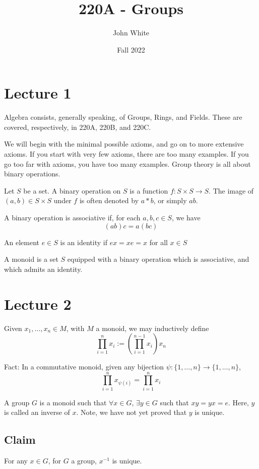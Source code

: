 \documentclass[x11names,reqno,14pt]{extarticle}
\title{220A - Groups}
\author{John White}
\date{Fall 2022}
\begin{document}
\section*{Lecture 1}

Algebra consists, generally speaking, of Groups, Rings, and Fields. These are covered, respectively, in 220A, 220B, and 220C. 


We will begin with the minimal possible axioms, and go on to more extensive axioms. If you start with very few axioms, there are too many examples. If you go too far with axioms, you have too many examples. Group theory is all about binary operations. 


Let $S$ be a set. A binary operation on $S$ is a function $f:S\times S \to S$. The image of $(a, b) \in S \times S$ under $f$ is often denoted by $a * b$, or simply $ab$. 

 
A binary operation is associative if, for each $a, b, c \in S$, we have 
\[
(ab)c = a(bc)
\]


An element $e \in S$ is an identity if $ex = xe = x$ for all $x \in S$

A monoid is a set $S$ equipped with a binary operation which is associative, and which admits an identity. 

\section*{Lecture 2}

Given $x_1, \dots, x_n \in M$, with $M$ a monoid, we may inductively define
\[
\prod_{i=1}^nx_i :=(\prod_{i=1}^{n - 1}x_i)x_n
\]

Fact: In a commutative monoid, given any bijection $\psi:\{1,\dots,n\}\to\{1,\dots,n\}$, 
\[
\prod_{i=1}^nx_{\psi(i)} = \prod_{i=1}^nx_i
\]


A group $G$ is a monoid such that $\forall x \in G$, $\exists y \in G$ such that $xy = yx = e$. Here, $y$ is called an inverse of $x$. Note, we have not yet proved that $y$ is unique. 

\subsection*{Claim}

For any $x \in G$, for $G$ a group, $x^{-1}$ is unique. 
\end{document}
